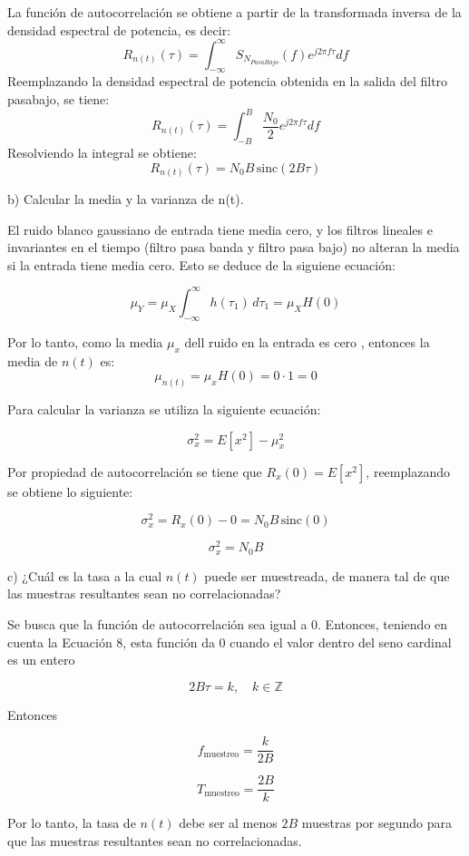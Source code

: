 	\noindent La función de autocorrelación se obtiene a partir de la transformada inversa de la densidad espectral de potencia, es decir:
		\[
			R_{n(t)}(\tau) = \int_{-\infty}^{\infty} S_{N_{PasaBajo}}(f) e^{j 2 \pi f \tau} df
		\]
	\noindent Reemplazando la densidad espectral de potencia obtenida en la salida del filtro pasabajo, se tiene:
		\[
			R_{n(t)}(\tau) = \int_{-B}^{B} \dfrac{N_0}{2} e^{j 2 \pi f \tau} df
		\]
	\noindent Resolviendo la integral se obtiene:
		\[
			R_{n(t)}(\tau) = N_0 B \, \text{sinc}(2 B \tau)
		\]
	

\noindent b) Calcular la media y la varianza de n(t).\par
\bigskip

\noindent El ruido blanco gaussiano de entrada tiene media cero, y los filtros lineales e invariantes en el tiempo (filtro pasa banda y filtro
	pasa bajo) no alteran la media si la entrada tiene media cero. Esto se deduce de la siguiene ecuación:
	
		\[
			\mu_Y = \mu_X \int_{-\infty}^{\infty} h(\tau_1)\, d\tau_1 = \mu_X H(0)
		\]

	\noindent Por lo tanto, como la media $\mu_x$ dell ruido en la entrada es cero , entonces la media de $n(t)$ es:
		\[
			\mu_{n(t)} = \mu_x H(0) = 0 \cdot 1 = 0
		\]
	
	\noindent Para calcular la varianza se utiliza la siguiente ecuación:

		\[
		\sigma_x^2 = E[x^2] - \mu_x^2
		\]

	\noindent Por propiedad de autocorrelación se tiene que \(R_x(0) = E[x^2]\), reemplazando se obtiene lo siguiente:

		\[
		\sigma_x^2 = R_x(0) - 0 = N_0 B \, \text{sinc}(0)
		\]

		\[
		\sigma_x^2 = N_0 B
		\]


\noindent c) ¿Cuál es la tasa a la cual $n(t)$ puede ser muestreada, de manera tal de que las muestras resultantes sean no correlacionadas? \par
\bigskip

\noindent Se busca que la función de autocorrelación sea igual a 0. Entonces, teniendo en cuenta la Ecuación 8, 
esta función da 0 cuando el valor dentro del seno cardinal es un entero

	\[
		2B\tau = k, \quad k \in \mathbb{Z}
	\]

\noindent Entonces

	\[
		f_{\text{muestreo}} = \frac{k}{2B}
	\]

	\[
		T_{\text{muestreo}} = \frac{2B}{k}
	\]

\noindent Por lo tanto, la tasa de \(n(t)\) debe ser al menos \(2B\) muestras por segundo para que las muestras 
resultantes sean no correlacionadas.
